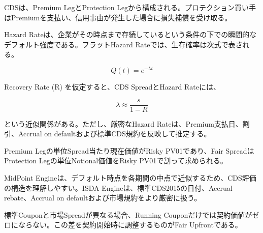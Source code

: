\documentclass[
  letterpaper,
  DIV=11,
  numbers=noendperiod]{scrreprt}
\begin{document}
CDSは、Premium LegとProtection
Legから構成される。プロテクション買い手はPremiumを支払い、信用事由が発生した場合に損失補償を受け取る。

Hazard
Rateは、企業がその時点まで存続しているという条件の下での瞬間的なデフォルト強度である。フラットHazard
Rateでは、生存確率は次式で表される。

\[
Q(t)
=
e^{-\lambda t}
\]

Recovery Rate (R) を仮定すると、CDS SpreadとHazard Rateには、

\[
\lambda
\approx
\frac{s}{1-R}
\]

という近似関係がある。ただし、厳密なHazard
Rateは、Premium支払日、割引、Accrual on
defaultおよび標準CDS規約を反映して推定する。

Premium Legの単位Spread当たり現在価値がRisky PV01であり、Fair
SpreadはProtection Legの単位Notional価値をRisky PV01で割って求められる。

MidPoint
Engineは、デフォルト時点を各期間の中点で近似するため、CDS評価の構造を理解しやすい。ISDA
Engineは、標準CDS2015の日付、Accrual rebate、Accrual on
defaultおよび市場規約をより厳密に扱う。

標準Couponと市場Spreadが異なる場合、Running
Couponだけでは契約価値がゼロにならない。この差を契約開始時に調整するものがFair
Upfrontである。
\end{document}
